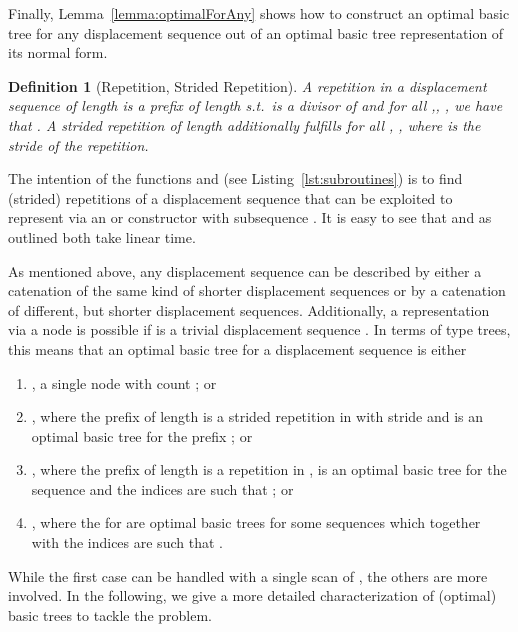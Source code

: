 \documentclass[a4paper,11pt]{article}
\newtheorem{definition}{Definition}
\begin{document}
Finally, Lemma~\ref{lemma:optimalForAny} shows how to construct an
optimal basic tree for any displacement sequence out of an optimal
basic tree representation of its normal form.

\begin{definition}[Repetition, Strided Repetition]
A \emph{repetition} in a displacement sequence  of length  is a
prefix  of length  s.t.\  is a divisor of  and
for all ,, ,  we have that .  A \emph{strided repetition} of length 
additionally fulfills  for all ,
, where  is the \emph{stride} of
the repetition.
\end{definition}

\begin{algorithm}[t]

\caption{Trivial checks for repetitions and strided repetitions.}
\label{lst:subroutines}
\end{algorithm}

The intention of the functions \FnRepeated and \FnStrided (see
Listing~\ref{lst:subroutines}) is to find (strided) repetitions  of
a displacement sequence  that can be exploited to represent  via
an  or  constructor with subsequence .  It is easy to
see that \FnRepeated and \FnStrided as outlined both take linear time.

As mentioned above, any displacement sequence  can be described by
either a catenation of the same kind of shorter displacement sequences
or by a catenation of different, but shorter displacement sequences.
Additionally, a representation via a  node is possible if 
is a trivial displacement sequence .
In terms of type trees, this means that an optimal basic tree  for
a displacement sequence  is either
\begin{enumerate}
\item , a single  node with count ; or
\item , where the prefix  of length  is a strided repetition in  with stride  and  is an
  optimal basic tree for the prefix ; or
\item , where the prefix
   of length  is a repetition in ,  is an
  optimal basic tree for the sequence  and the indices  are such that
  ; or
\item , where the  for  are optimal basic
  trees for some sequences  which together with the indices
   are such that .
\end{enumerate}
While the first case can be handled with a single scan of , the
others are more involved.  In the following, we give a more detailed
characterization of (optimal) basic trees to tackle the problem.
\end{document}
